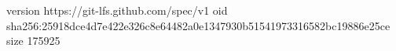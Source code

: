 version https://git-lfs.github.com/spec/v1
oid sha256:25918dce4d7e422e326c8e64482a0e1347930b51541973316582bc19886e25ce
size 175925
